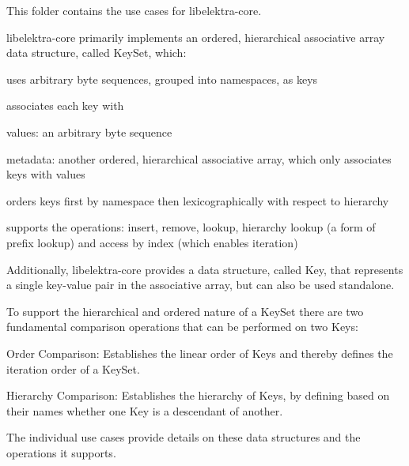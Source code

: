 \label{doc_usecases_core_README_md_md_doc_usecases_core_README}%
%
 This folder contains the use cases for {\ttfamily libelektra-\/core}.

{\ttfamily libelektra-\/core} primarily implements an ordered, hierarchical associative array data structure, called {\ttfamily Key\+Set}, which\+:


\begin{DoxyEnumerate}
\item uses arbitrary byte sequences, grouped into namespaces, as keys
\item associates each key with
\begin{DoxyEnumerate}
\item values\+: an arbitrary byte sequence
\item metadata\+: another ordered, hierarchical associative array, which only associates keys with values
\end{DoxyEnumerate}
\item orders keys first by namespace then lexicographically with respect to hierarchy
\item supports the operations\+: insert, remove, lookup, hierarchy lookup (a form of prefix lookup) and access by index (which enables iteration)
\end{DoxyEnumerate}

Additionally, {\ttfamily libelektra-\/core} provides a data structure, called {\ttfamily Key}, that represents a single key-\/value pair in the associative array, but can also be used standalone.

To support the hierarchical and ordered nature of a {\ttfamily Key\+Set} there are two fundamental comparison operations that can be performed on two {\ttfamily Key}s\+:


\begin{DoxyEnumerate}
\item Order Comparison\+: Establishes the linear order of {\ttfamily Key}s and thereby defines the iteration order of a {\ttfamily Key\+Set}.
\item Hierarchy Comparison\+: Establishes the hierarchy of {\ttfamily Key}s, by defining based on their names whether one {\ttfamily Key} is a descendant of another.
\end{DoxyEnumerate}

The individual use cases provide details on these data structures and the operations it supports. 